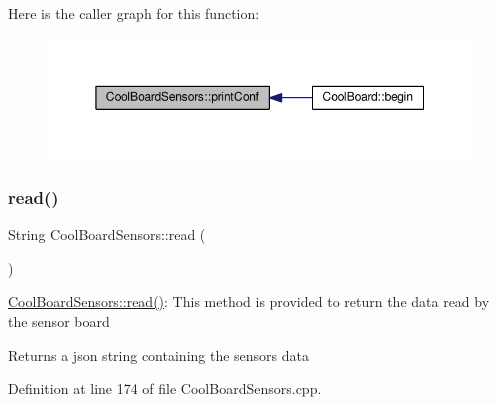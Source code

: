 Here is the caller graph for this function\+:\nopagebreak
\begin{figure}[H]
\begin{center}
\leavevmode
\includegraphics[width=350pt]{de/d46/class_cool_board_sensors_af6fd79505815b204c178617ecf54c873_icgraph}
\end{center}
\end{figure}
\mbox{\label{class_cool_board_sensors_a91badb2539d91fda8679f2a597874c48}} 
\subsubsection{\texorpdfstring{read()}{read()}}
{\footnotesize\ttfamily String Cool\+Board\+Sensors\+::read (\begin{DoxyParamCaption}{ }\end{DoxyParamCaption})}

\hyperlink{class_cool_board_sensors_a91badb2539d91fda8679f2a597874c48}{Cool\+Board\+Sensors\+::read()}\+: This method is provided to return the data read by the sensor board

\begin{DoxyReturn}{Returns}
a json string containing the sensors data 
\end{DoxyReturn}


Definition at line 174 of file Cool\+Board\+Sensors.\+cpp.



